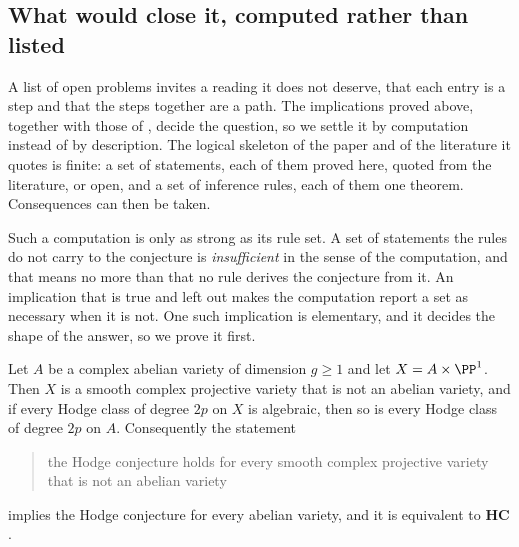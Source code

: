 \subsection{What would close it, computed rather than listed}
\label{ssec:closure}

A list of open problems invites a reading it does not deserve, that each entry
is a step and that the steps together are a path. The implications proved
above, together with those of , decide the question, so
we settle it by computation instead of by description. The logical skeleton
of the paper and of the literature it quotes is finite: a set of statements,
each of them proved here, quoted from the literature, or open, and a set of
inference rules, each of them one theorem. Consequences can then be taken.

Such a computation is only as strong as its rule set. A set of statements
the rules do not carry to the conjecture is \emph{insufficient} in the sense
of the computation, and that means no more than that no rule derives the
conjecture from it. An implication that is true and left out makes the
computation report a set as necessary when it is not. One such implication
is elementary, and it decides the shape of the answer, so we prove it first.

\begin{proposition}\label{prop:f3ishc}
Let $A$ be a complex abelian variety of dimension $g\ge1$ and let
$X=A\times\PP^{1}$. Then $X$ is a smooth complex projective variety that is
not an abelian variety, and if every Hodge class of degree $2p$ on $X$ is
algebraic, then so is every Hodge class of degree $2p$ on $A$. Consequently
the statement
\begin{quote}
the Hodge conjecture holds for every smooth complex projective variety that
is not an abelian variety
\end{quote}
implies the Hodge conjecture for every abelian variety, and it is equivalent
to $\mathbf{HC}$.
\end{proposition}

